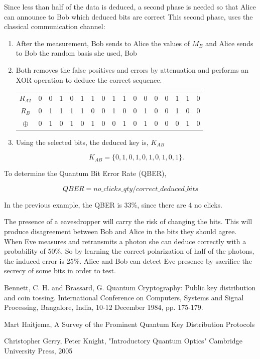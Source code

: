 Since less than half of the data is deduced, a second phase is needed so that Alice can announce to Bob which deduced bits are correct This second phase, uses the classical communication channel:
\begin{enumerate}
	
	\item After the measurement, Bob sends to Alice the values of $M_{B}$ and Alice sends to Bob the random basis she used, Bob
	\item Both removes the false positives and errors by attenuation and performs an XOR operation to deduce the correct sequence.
	
	\begin{table}[H]
		\centering
		\begin{tabular}{c|c c c c c c c c c c c c c c c c}
			$R_{A2}$ & 0 & 0 & 1 & 0 & 1 & 1 & 0 & 1 & 1 & 0 & 0 & 0 & 0 & 1 & 1 & 0 \\
			$R_{B}$  & 0 & 1 & 1 & 1 & 1 & 0 & 0 & 1 & 0 & 0 & 1 & 0 & 0 & 1 & 0 & 0 \\ \hline
			$\oplus$ & 0 & 1 & 0 & 1 & 0 & 1 & 0 & 0 & 1 & 0 & 1 & 0 & 0 & 0 & 1 & 0 \\ 
		\end{tabular}
	\end{table}
	
	\item Using the selected bits, the deduced key is, $K_{AB}$
	
  	$$ K_{AB} = \{0,1,0,1,0,1,0,1,0,1\}.$$
		
\end{enumerate}

	To determine the Quantum Bit Error Rate (QBER), 
	
	$$ QBER = no\_clicks\_qty / correct\_deduced\_bits $$
	
	In the previous example, the QBER is 33$\%$, since there are 4 no clicks.	

The presence of a eavesdropper will carry the risk of changing the bits. This will produce disagreement between Bob and Alice in the bits they should agree. When Eve measures and retransmits a photon she can deduce correctly with a probability of 50\%. So by learning the correct polarization of half of the photons, the induced error is 25\%. Alice and Bob can detect Eve presence by sacrifice the secrecy of some bits in order to test.

\begin{thebibliography}{2}
Bennett, C. H. and Brassard,
G. Quantum Cryptography: Public key distribution and coin tossing.
International Conference on Computers, Systems and Signal Processing, Bangalore, India, 10-12 December 1984, pp. 175-179.

Mart Haitjema, A Survey of the Prominent Quantum Key Distribution Protocols

Christopher Gerry, Peter Knight, "Introductory Quantum Optics" Cambridge University Press, 2005

\end{thebibliography}
\cleardoublepage

